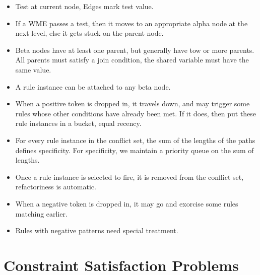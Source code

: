 \documentclass[a4paper]{article}
\begin{document}
\begin{itemize}
    \item Test at current node, Edges mark test value.
    \item If a WME passes a test, then it moves to an appropriate alpha node at the next level, else it gets stuck on the parent node.
    \item Beta nodes have at least one parent, but generally have tow or more parents. All parents must satisfy a join condition, the shared variable must have the same value.
    \item A rule instance can be attached to any beta node.
    \item When a positive token is dropped in, it travels down, and may trigger some rules whose other conditions have already been met. If it does, then put these rule instances in a bucket, equal recency.
    \item For every rule instance in the conflict set, the sum of the lengths of the paths defines specificity. For specificity, we maintain a priority queue on the sum of lengths.
    \item Once a rule instance is selected to fire, it is removed from the conflict set, refactoriness is automatic.
    \item When a negative token is dropped in, it may go and exorcise some rules matching earlier.
    \item Rules with negative patterns need special treatment.
\end{itemize}

\section{Constraint Satisfaction Problems}
\end{document}
